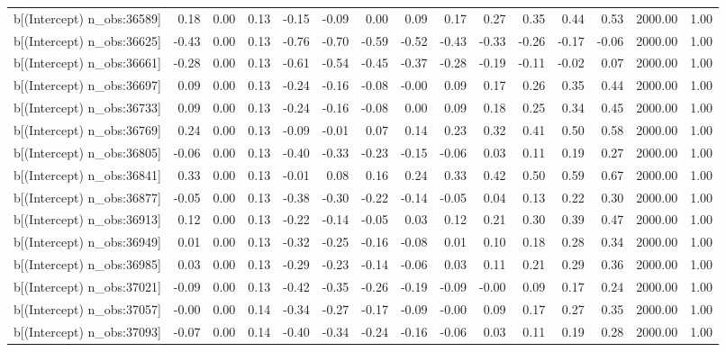 \begin{table}[ht]
\begin{tabular}{rrrrrrrrrrrrrrr}
  b[(Intercept) n\_obs:36589] & 0.18 & 0.00 & 0.13 & -0.15 & -0.09 & 0.00 & 0.09 & 0.17 & 0.27 & 0.35 & 0.44 & 0.53 & 2000.00 & 1.00 \\ 
  b[(Intercept) n\_obs:36625] & -0.43 & 0.00 & 0.13 & -0.76 & -0.70 & -0.59 & -0.52 & -0.43 & -0.33 & -0.26 & -0.17 & -0.06 & 2000.00 & 1.00 \\ 
  b[(Intercept) n\_obs:36661] & -0.28 & 0.00 & 0.13 & -0.61 & -0.54 & -0.45 & -0.37 & -0.28 & -0.19 & -0.11 & -0.02 & 0.07 & 2000.00 & 1.00 \\ 
  b[(Intercept) n\_obs:36697] & 0.09 & 0.00 & 0.13 & -0.24 & -0.16 & -0.08 & -0.00 & 0.09 & 0.17 & 0.26 & 0.35 & 0.44 & 2000.00 & 1.00 \\ 
  b[(Intercept) n\_obs:36733] & 0.09 & 0.00 & 0.13 & -0.24 & -0.16 & -0.08 & 0.00 & 0.09 & 0.18 & 0.25 & 0.34 & 0.45 & 2000.00 & 1.00 \\ 
  b[(Intercept) n\_obs:36769] & 0.24 & 0.00 & 0.13 & -0.09 & -0.01 & 0.07 & 0.14 & 0.23 & 0.32 & 0.41 & 0.50 & 0.58 & 2000.00 & 1.00 \\ 
  b[(Intercept) n\_obs:36805] & -0.06 & 0.00 & 0.13 & -0.40 & -0.33 & -0.23 & -0.15 & -0.06 & 0.03 & 0.11 & 0.19 & 0.27 & 2000.00 & 1.00 \\ 
  b[(Intercept) n\_obs:36841] & 0.33 & 0.00 & 0.13 & -0.01 & 0.08 & 0.16 & 0.24 & 0.33 & 0.42 & 0.50 & 0.59 & 0.67 & 2000.00 & 1.00 \\ 
  b[(Intercept) n\_obs:36877] & -0.05 & 0.00 & 0.13 & -0.38 & -0.30 & -0.22 & -0.14 & -0.05 & 0.04 & 0.13 & 0.22 & 0.30 & 2000.00 & 1.00 \\ 
  b[(Intercept) n\_obs:36913] & 0.12 & 0.00 & 0.13 & -0.22 & -0.14 & -0.05 & 0.03 & 0.12 & 0.21 & 0.30 & 0.39 & 0.47 & 2000.00 & 1.00 \\ 
  b[(Intercept) n\_obs:36949] & 0.01 & 0.00 & 0.13 & -0.32 & -0.25 & -0.16 & -0.08 & 0.01 & 0.10 & 0.18 & 0.28 & 0.34 & 2000.00 & 1.00 \\ 
  b[(Intercept) n\_obs:36985] & 0.03 & 0.00 & 0.13 & -0.29 & -0.23 & -0.14 & -0.06 & 0.03 & 0.11 & 0.21 & 0.29 & 0.36 & 2000.00 & 1.00 \\ 
  b[(Intercept) n\_obs:37021] & -0.09 & 0.00 & 0.13 & -0.42 & -0.35 & -0.26 & -0.19 & -0.09 & -0.00 & 0.09 & 0.17 & 0.24 & 2000.00 & 1.00 \\ 
  b[(Intercept) n\_obs:37057] & -0.00 & 0.00 & 0.14 & -0.34 & -0.27 & -0.17 & -0.09 & -0.00 & 0.09 & 0.17 & 0.27 & 0.35 & 2000.00 & 1.00 \\ 
  b[(Intercept) n\_obs:37093] & -0.07 & 0.00 & 0.14 & -0.40 & -0.34 & -0.24 & -0.16 & -0.06 & 0.03 & 0.11 & 0.19 & 0.28 & 2000.00 & 1.00 \\ 

\end{tabular}
\end{table}
